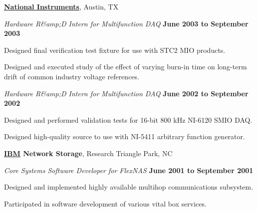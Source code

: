\documentclass[10pt]{article}
\newcommand{\halfblankline}{\quad\vspace{-0.5\baselineskip}\pagebreak[3]}
\begin{document}
\halfblankline

\href{http://www.ni.com/}{\textbf{National Instruments}},
Austin, TX
\begin{outerlist}

\item[] \textit{Hardware R\&amp;D Intern for Multifunction DAQ}%
        \hfill \textbf{June 2003 to September 2003}
\begin{innerlist}
\item Designed final verification test fixture for use with STC2 MIO
        products.
\item Designed and executed study of the effect of varying burn-in time
        on long-term drift of common industry voltage references.
\end{innerlist}

\item[] \textit{Hardware R\&amp;D Intern for Multifunction DAQ}%
        \hfill \textbf{June 2002 to September 2002}
\begin{innerlist}
\item Designed and performed validation tests for 16-bit 800 kHz
        NI-6120 SMIO DAQ.

\item Designed high-quality source to use with NI-5411 arbitrary
        function generator.
\end{innerlist}

\end{outerlist}

\halfblankline

\textbf{\href{http://www.ibm.com/}{IBM} Network Storage},
Research Triangle Park, NC
\begin{outerlist}

\item[] \textit{Core Systems Software Developer for FlexNAS}%
        \hfill \textbf{June 2001 to September 2001}
\begin{innerlist}
\item Designed and implemented highly available multihop communications
        subsystem.
\item Participated in software development of various vital box
        services.
\end{innerlist}

\end{outerlist}

\halfblankline
\end{document}
